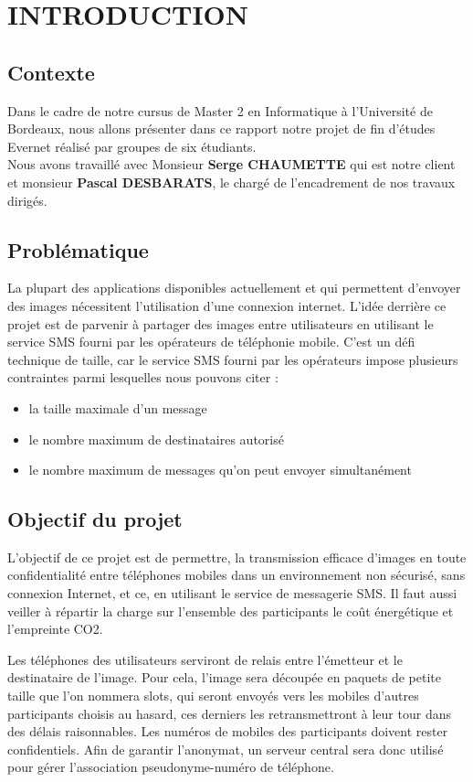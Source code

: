 \chapter{ INTRODUCTION}

\section{Contexte}
Dans le cadre de notre cursus de Master 2 en Informatique à l'Université de Bordeaux, nous allons présenter dans ce rapport notre projet de fin d'études Evernet réalisé par groupes de six étudiants. \\Nous avons travaillé avec Monsieur \textbf{Serge CHAUMETTE} qui est  notre client et monsieur \textbf{Pascal DESBARATS}, le chargé de l'encadrement de nos travaux dirigés.

\section{Problématique}
La plupart des applications disponibles actuellement et qui permettent d'envoyer des images nécessitent l'utilisation d'une connexion internet. L'idée derrière ce projet est de parvenir à partager des images entre utilisateurs en utilisant le service SMS fourni par les opérateurs de téléphonie mobile. C'est un défi technique de taille, car le service SMS fourni par les opérateurs impose plusieurs contraintes parmi lesquelles nous pouvons citer :

\begin{itemize}
    \item la taille maximale d'un message
    \item le nombre maximum de destinataires autorisé
    \item le nombre maximum de messages qu'on peut envoyer simultanément
\end{itemize}

\section{Objectif du projet}
L'objectif de ce projet est de permettre, la transmission efficace d'images en toute confidentialité entre téléphones mobiles dans un environnement non sécurisé, sans connexion Internet, et ce, en utilisant le service de messagerie SMS. Il faut aussi veiller à répartir la charge sur l'ensemble des participants le coût énergétique et l'empreinte CO2. 

Les téléphones des utilisateurs serviront de relais entre l'émetteur et le destinataire de l'image. Pour cela, l'image sera découpée en paquets de petite taille que l'on nommera slots, qui seront envoyés vers les mobiles d'autres participants choisis au hasard, ces derniers les retransmettront à leur tour dans des délais raisonnables.
Les numéros de mobiles des participants doivent rester confidentiels. Afin de garantir l'anonymat, un serveur central sera donc utilisé pour gérer l'association pseudonyme-numéro de téléphone.

